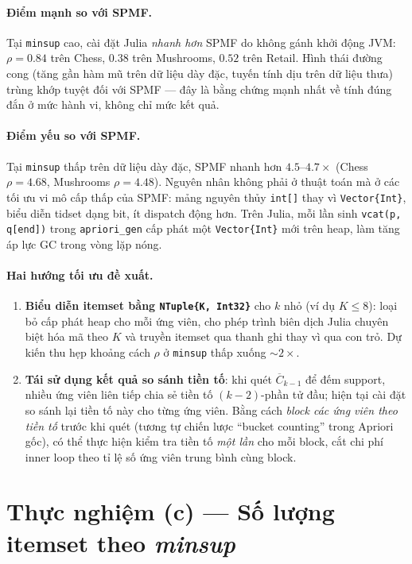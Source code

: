 \paragraph{Điểm mạnh so với SPMF.} Tại \texttt{minsup} cao, cài đặt Julia \emph{nhanh hơn} SPMF do không gánh khởi động JVM: $\rho = 0.84$ trên Chess, $0.38$ trên Mushrooms, $0.52$ trên Retail. Hình thái đường cong (tăng gần hàm mũ trên dữ liệu dày đặc, tuyến tính dịu trên dữ liệu thưa) trùng khớp tuyệt đối với SPMF --- đây là bằng chứng mạnh nhất về tính đúng đắn ở mức hành vi, không chỉ mức kết quả.

\paragraph{Điểm yếu so với SPMF.} Tại \texttt{minsup} thấp trên dữ liệu dày đặc, SPMF nhanh hơn $4.5$--$4.7\times$ (Chess $\rho=4.68$, Mushrooms $\rho=4.48$). Nguyên nhân không phải ở thuật toán mà ở các tối ưu vi mô cấp thấp của SPMF: mảng nguyên thủy \texttt{int[]} thay vì \texttt{Vector\{Int\}}, biểu diễn tidset dạng bit, ít dispatch động hơn. Trên Julia, mỗi lần sinh \texttt{vcat(p, q[end])} trong \texttt{apriori\_gen} cấp phát một \texttt{Vector\{Int\}} mới trên heap, làm tăng áp lực GC trong vòng lặp nóng.

\paragraph{Hai hướng tối ưu đề xuất.}
\begin{enumerate}
    \item \textbf{Biểu diễn itemset bằng \texttt{NTuple\{K, Int32\}}} cho $k$ nhỏ (ví dụ $K \leq 8$): loại bỏ cấp phát heap cho mỗi ứng viên, cho phép trình biên dịch Julia chuyên biệt hóa mã theo $K$ và truyền itemset qua thanh ghi thay vì qua con trỏ. Dự kiến thu hẹp khoảng cách $\rho$ ở \texttt{minsup} thấp xuống $\sim 2\times$.
    \item \textbf{Tái sử dụng kết quả so sánh tiền tố}: khi quét $\overline{C}_{k-1}$ để đếm support, nhiều ứng viên liên tiếp chia sẻ tiền tố $(k-2)$-phần tử đầu; hiện tại cài đặt so sánh lại tiền tố này cho từng ứng viên. Bằng cách \emph{block các ứng viên theo tiền tố} trước khi quét (tương tự chiến lược ``bucket counting'' trong Apriori gốc), có thể thực hiện kiểm tra tiền tố \emph{một lần} cho mỗi block, cắt chi phí inner loop theo tỉ lệ số ứng viên trung bình cùng block.
\end{enumerate}

\section{Thực nghiệm (c) --- Số lượng itemset theo \textit{minsup}}
\label{sec:exp-c}

